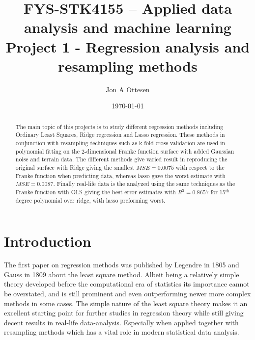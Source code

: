 \documentclass[uio,jmp,amsmath,amssymb,reprint,nofootinbib]{revtex4-1}
\numberwithin{equation}{section}
\begin{document}
\title{FYS-STK4155 – Applied data analysis and machine learning\\ Project 1 - Regression analysis and resampling methods}%

\author{Jon A Ottesen}
\date{\today}

\begin{abstract}
The main topic of this projects is to study different regression methods including Ordinary Least Squares, Ridge regression and Lasso regression. These methods in conjunction with resampling techniques such as k-fold cross-validation are used in polynomial fitting on the 2-dimensional Franke function surface with added Gaussian noise and terrain data. The different methods give varied result in reproducing the original surface with Ridge giving the smallest \(MSE = 0.0075\) with respect to the Franke function when predicting data, whereas lasso gave the worst estimate with \(MSE = 0.0087\). Finally real-life data is the analyzed using the same techniques as the Franke function with OLS giving the best error estimates with \(R^2 = 0.8657\) for 15\(^\text{th}\) degree polynomial over ridge, with lasso preforming worst.

\end{abstract}

\maketitle


\section{Introduction}\label{sec:Introduction}

The first paper on regression methods was published by Legendre in 1805 and Gauss in 1809 about the least square method\cite{wiki:Regression_analysis}. Albeit being a relatively simple theory developed before the computational era of statistics its importance cannot be overstated, and is still prominent and even outperforming newer more complex methods in some cases. The simple nature of the least square theory makes it an excellent starting point for further studies in regression theory while still giving decent results in real-life data-analysis. Especially when applied together with resampling methods which has a vital role in modern statistical data analysis.
\end{document}
